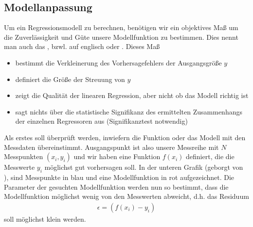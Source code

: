 \documentclass[letterpaper,10pt,english]{jupyterBook}
\begin{document}
\subsection{Modellanpassung }
\label{\detokenize{content/1_Kurvenanpassung:modellanpassung-a-id-sec-modellanpassung-a}}
\sphinxAtStartPar
Um ein Regressionsmodell zu berechnen, benötigen wir ein objektives Maß um die Zuverlässigkeit und Güte unsere Modellfunktion zu bestimmen. Dies nennt man auch das , bzwl. auf englisch  oder . Dieses Maß
\begin{itemize}
\item {} 
\sphinxAtStartPar
bestimmt die Verkleinerung des Vorhersagefehlers der Ausgangsgröße \(y\)

\item {} 
\sphinxAtStartPar
definiert die Größe der Streuung von \(y\)

\item {} 
\sphinxAtStartPar
zeigt die Qualität der linearen Regression, aber nicht ob das Modell richtig ist

\item {} 
\sphinxAtStartPar
sagt nichts über die statistische Signifikanz des ermittelten Zusammenhangs der einzelnen Regressoren aus (Signifikanztest notwendig)

\end{itemize}

\sphinxAtStartPar
Als erstes soll überprüft werden, inwiefern die Funktion oder das Modell mit den Messdaten übereinstimmt. Ausgangspunkt ist also unsere Messreihe mit \(N\) Messpunkten \((x_i, y_i)\) und wir haben eine Funktion \(f(x_i)\) definiert, die die Messwerte \(y_i\) möglichst gut vorhersagen soll. In der unteren Grafik (geborgt von ), sind Messpunkte in blau und eine Modellfunktion in rot aufgezeichnet. Die Parameter der gesuchten Modellfunktion werden nun so bestimmt, dass die Modellfunktion möglichst wenig von den Messwerten abweicht, d.h. das Residuum
\begin{equation*}
\begin{split}\epsilon = \left( f(x_i) - y_i\right)\end{split}
\end{equation*}
\sphinxAtStartPar
soll möglichst klein werden.

\sphinxAtStartPar
{}
\end{document}
